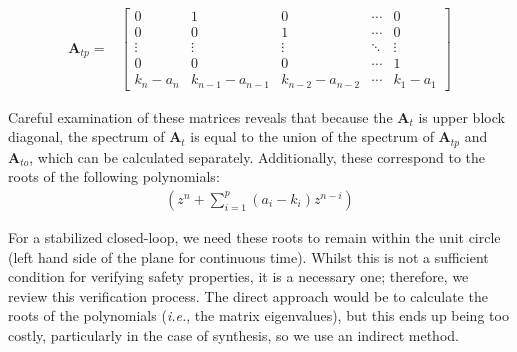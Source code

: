 \documentclass[runningheads,a4paper]{llncs}
\newcommand{\mat}[1]{\boldsymbol{#1}}
\begin{document}
\begin{align*}
\mat{A}_{tp}=&\left[
\begin{array}{ccccc}
0&1&0&\cdots&0\\
0&0&1&\cdots&0\\
\vdots&\vdots&\vdots&\ddots&\vdots\\
0&0&0&\cdots&1\\
k_n-a_n&k_{n-1}-a_{n-1}&k_{n-2}-a_{n-2}&\cdots&k_1-a_1
\end{array}\right]
\label{eq:cf_SISO_2}
\end{align*}

Careful examination of these matrices reveals that because the $\mat{A}_t$ is 
upper block diagonal, the spectrum of $\mat{A}_t$ is equal to the union of the 
spectrum of $\mat{A}_{tp}$ and $\mat{A}_{to}$, which can be calculated separately. 
Additionally, these correspond to the roots of the following polynomials:
%
\begin{align*}
\left(z^n+\sum_{i=1}^p{(a_i-k_i)z^{n-i}}\right)
\end{align*}

For a stabilized closed-loop, we need these roots to remain within the
unit circle (left hand side of the plane for continuous time).  Whilst
this is not a sufficient condition for verifying safety properties, it
is a necessary one; therefore, we review this verification process.  
The direct approach would be to calculate the roots of the
polynomials (\emph{i.e.}, the matrix eigenvalues), but this ends
up being too costly, particularly in the case of synthesis, so we use
an indirect method.
\end{document}
